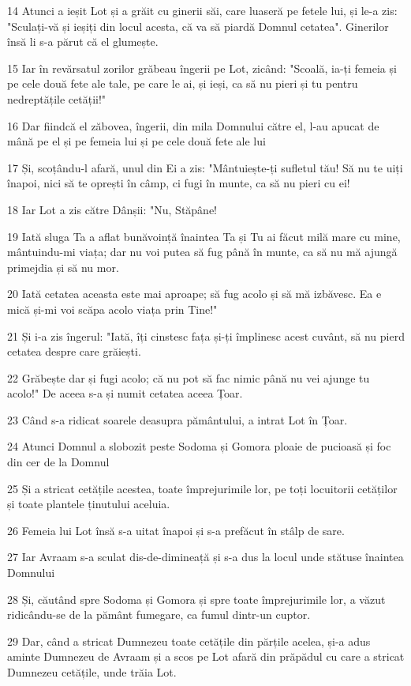\par 14 Atunci a ieșit Lot și a grăit cu ginerii săi, care luaseră pe fetele lui, și le-a zis: "Sculați-vă și ieșiți din locul acesta, că va să piardă Domnul cetatea". Ginerilor însă li s-a părut că el glumește.
\par 15 Iar în revărsatul zorilor grăbeau îngerii pe Lot, zicând: "Scoală, ia-ți femeia și pe cele două fete ale tale, pe care le ai, și ieși, ca să nu pieri și tu pentru nedreptățile cetății!"
\par 16 Dar fiindcă el zăbovea, îngerii, din mila Domnului către el, l-au apucat de mână pe el și pe femeia lui și pe cele două fete ale lui
\par 17 Și, scoțându-l afară, unul din Ei a zis: "Mântuiește-ți sufletul tău! Să nu te uiți înapoi, nici să te oprești în câmp, ci fugi în munte, ca să nu pieri cu ei!
\par 18 Iar Lot a zis către Dânșii: "Nu, Stăpâne!
\par 19 Iată sluga Ta a aflat bunăvoință înaintea Ta și Tu ai făcut milă mare cu mine, mântuindu-mi viața; dar nu voi putea să fug până în munte, ca să nu mă ajungă primejdia și să nu mor.
\par 20 Iată cetatea aceasta este mai aproape; să fug acolo și să mă izbăvesc. Ea e mică și-mi voi scăpa acolo viața prin Tine!"
\par 21 Și i-a zis îngerul: "Iată, îți cinstesc fața și-ți împlinesc acest cuvânt, să nu pierd cetatea despre care grăiești.
\par 22 Grăbește dar și fugi acolo; că nu pot să fac nimic până nu vei ajunge tu acolo!" De aceea s-a și numit cetatea aceea Țoar.
\par 23 Când s-a ridicat soarele deasupra pământului, a intrat Lot în Țoar.
\par 24 Atunci Domnul a slobozit peste Sodoma și Gomora ploaie de pucioasă și foc din cer de la Domnul
\par 25 Și a stricat cetățile acestea, toate împrejurimile lor, pe toți locuitorii cetăților și toate plantele ținutului aceluia.
\par 26 Femeia lui Lot însă s-a uitat înapoi și s-a prefăcut în stâlp de sare.
\par 27 Iar Avraam s-a sculat dis-de-dimineață și s-a dus la locul unde stătuse înaintea Domnului
\par 28 Și, căutând spre Sodoma și Gomora și spre toate împrejurimile lor, a văzut ridicându-se de la pământ fumegare, ca fumul dintr-un cuptor.
\par 29 Dar, când a stricat Dumnezeu toate cetățile din părțile acelea, și-a adus aminte Dumnezeu de Avraam și a scos pe Lot afară din prăpădul cu care a stricat Dumnezeu cetățile, unde trăia Lot.
